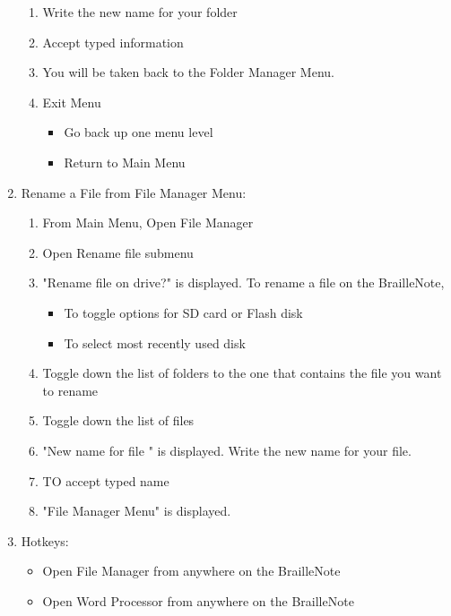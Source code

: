 \documentclass[10pt,letterpaper,twoside]{report}
\begin{document}
\begin{enumerate}
\begin{enumerate}
		      \item Write the new name for your folder
		      \item Accept typed information 
		      \item You will be taken back to the Folder Manager Menu.
		      \item Exit Menu
		            \begin{itemize}
			            \item Go back up one menu level 
			            \item Return to Main Menu 
		            \end{itemize}
	      \end{enumerate}
	\item Rename a File from File Manager Menu:
	      \begin{enumerate}
		      \item From Main Menu, Open File Manager 
		      \item Open Rename file submenu 
		      \item "Rename file on drive?" is displayed. To rename a file on the BrailleNote,
		            \begin{itemize}
			            \item To toggle options for SD card or Flash disk 
			            \item To select most recently used disk 
		            \end{itemize}
		      \item Toggle down the list of folders to the one  that contains the file you want to rename 
		      \item Toggle down the list of files 
		      \item "New name for file " is displayed. Write the new name for your file.
		      \item TO accept typed name 
		      \item "File Manager Menu" is displayed.
	      \end{enumerate}
	\item Hotkeys:
	      \begin{itemize}
		      \item Open File Manager from anywhere on the BrailleNote 
		      \item Open Word Processor from anywhere on the BrailleNote 
	      \end{itemize}
\end{enumerate}
\end{document}
